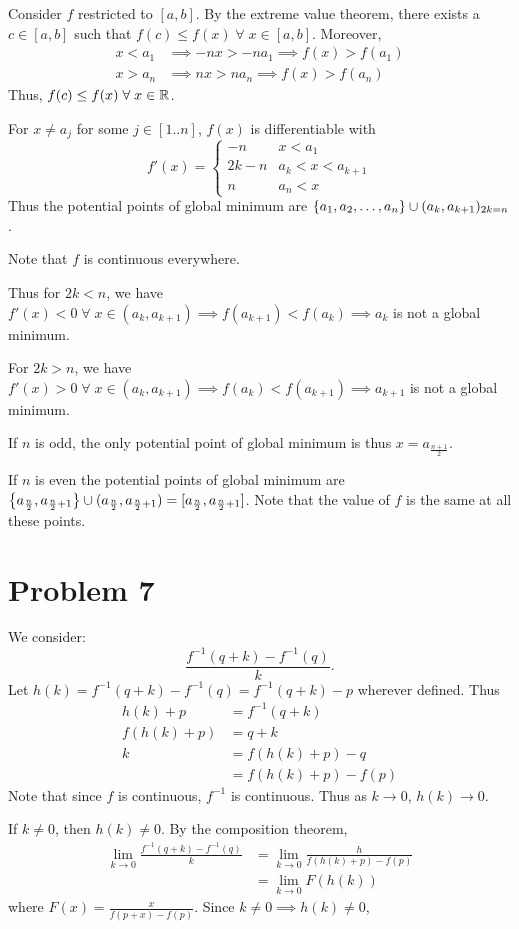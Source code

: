 \documentclass[12pt]{article}
\begin{document}
Consider $f$ restricted to $[a, b]$.
By the extreme value theorem, there exists a $c \in [a, b]$ such that $f(c) \leq f(x) \;\forall\; x \in [a, b]$. Moreover, \begin{align*}
    x < a_{1} &\implies -nx > -n a_{1} \implies f(x) > f(a_{1}) \\
    x > a_{n} &\implies nx > na_{n} \implies f(x) > f(a_{n})
\end{align*}
Thus, $f(c) \leq f(x) \;\forall\; x \in \mathbb{R}$.

For $x \neq a_{j}$ for some $j \in [1 .. n]$, $f(x)$ is differentiable with \[
    f'(x) =
    \begin{cases}
        -n & x < a_{1} \\
        2k - n & a_{k} < x < a_{k+1} \\
        n & a_{n} < x
    \end{cases}
\] Thus the potential points of global minimum are $\set{a_{1}, a_{2}, \dots, a_{n}} \cup (a_{k}, a_{k+1})_{2k = n}$.

Note that $f$ is continuous everywhere.

Thus for $2k < n$, we have $f'(x) < 0 \;\forall\; x \in (a_{k}, a_{k + 1}) \implies f(a_{k + 1}) < f(a_{k}) \implies a_{k}$ is not a global minimum.

For $2k > n$, we have $f'(x) > 0 \;\forall\; x \in (a_{k}, a_{k+1}) \implies f(a_{k}) < f(a_{k + 1}) \implies a_{k+1}$ is not a global minimum.

If $n$ is odd, the only potential point of global minimum is thus $x = a_{\frac{n + 1}{2}}$.

If $n$ is even the potential points of global minimum are $\set{a_{\frac{n}{2}}, a_{\frac{n}{2} + 1}} \cup (a_{\frac{n}{2}}, a_{\frac{n}{2} + 1}) = [a_{\frac{n}{2}}, a_{\frac{n}{2} + 1}]$.
Note that the value of $f$ is the same at all these points.

\section*{Problem 7}
We consider: \[
    \frac{f^{-1}(q + k) - f^{-1}(q)}{k}.
\] Let $h(k) = f^{-1}(q + k) - f^{-1}(q) = f^{-1}(q + k) - p$ wherever defined. Thus
\begin{align*}
    h(k) + p &= f^{-1}(q + k) \\
    f(h(k) + p) &= q + k \\
    k &= f(h(k) + p) - q \\
    &= f(h(k) + p) - f(p)
\end{align*}
Note that since $f$ is continuous, $f^{-1}$ is continuous.
Thus as $k \to 0$, $h(k) \to 0$.

If $k \neq 0$, then $h(k) \neq 0$. By the composition theorem,
\begin{align*}
    \lim_{k \to 0} \frac{f^{-1}(q + k) - f^{-1}(q)}{k} &= \lim_{k \to 0} \frac{h}{f(h(k) + p) - f(p)} \\
    &= \lim_{k \to 0} F(h(k))
\end{align*}
where $F(x) = \frac{x}{f(p + x) - f(p)}$. Since $k \neq 0 \implies h(k) \neq 0$,
\end{document}
